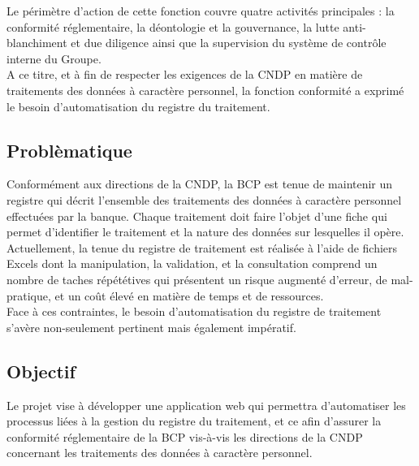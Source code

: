 \noindent Le périmètre d'action de cette fonction couvre quatre activités principales : la conformité réglementaire, la déontologie et la gouvernance, la lutte anti-blanchiment et due diligence ainsi que la supervision du système de contrôle interne du Groupe.\\

\noindent A ce titre, et à fin de respecter les exigences de la CNDP en matière de traitements des données à caractère personnel, la fonction conformité a exprimé le besoin d'automatisation du registre du traitement.

\subsection{Problèmatique}
Conformément aux directions de la CNDP, la BCP est tenue de maintenir un registre qui décrit l'ensemble des traitements des données à caractère personnel effectuées par la banque. Chaque traitement doit faire l'objet d'une fiche qui permet d'identifier le traitement et la nature des données sur lesquelles il opère. \\ 

\noindent Actuellement, la tenue du registre de traitement est réalisée à l'aide de fichiers Excels dont la manipulation, la validation, et la consultation comprend un nombre de taches répététives qui présentent un risque augmenté d'erreur, de mal-pratique, et un coût élevé en matière de temps et de ressources.\\

\noindent Face à ces contraintes, le besoin d'automatisation du registre de traitement s'avère non-seulement pertinent mais également impératif.

\subsection{Objectif}
Le projet vise à développer une application web qui permettra d'automatiser les processus liées à la gestion du registre du traitement, et ce afin d'assurer la conformité réglementaire de la BCP vis-à-vis les directions de la CNDP concernant les traitements des données à caractère personnel. 

